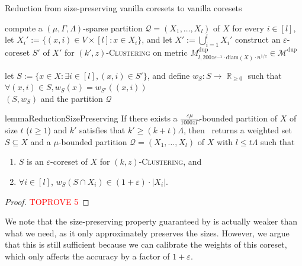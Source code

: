 \documentclass[letterpaper,11pt]{article}
\theoremstyle{plain}
\theoremstyle{definition}
\theoremstyle{remark}
\DeclareMathOperator{\R}{\mathbb{R}}
\newcommand{\diam}{\mathrm{diam}}
\newcommand{\dup}{\mathrm{dup}}
\newcommand{\eps}{\varepsilon}
\newcommand{\calM}{\mathcal{M}}
\newcommand{\calQ}{\mathcal{Q}}
\newcommand{\ProblemName}[1]{\textsc{#1}}
\newcommand{\kzC}{\ProblemName{$(k,z)$-Clustering}\xspace}
\newcommand{\tzC}[1]{\ProblemName{$(#1,z)$-Clustering}\xspace}
\begin{document}
\begin{algorithm}[ht]
    \caption{Reduction from size-preserving vanilla coresets to vanilla coresets}
    \label{alg:size-preserving}
    \begin{algorithmic}[1]
        \State compute a $(\mu,\Gamma,\Lambda)$-sparse partition $\calQ=(X_1,\dots,X_l)$ of $X$ \label{alg line:sparse partition} 
        \State for every $i\in [l]$, let $X_i':=\{(x,i)\in V\times [l]: x\in X_i\}$, and let $X':=\bigcup_{i=1}^l X_i'$
        \label{alg line:mapping}
        \State construct an $\eps$-coreset $S'$ of $X'$ for \tzC{k'} on metric $M^\dup_{l,200z\eps^{-1}\cdot \diam(X)\cdot n^{1/z}}\in \calM^\dup$ \label{alg line:vanilla coreset}


        \State let $S:=\{x\in X: \exists i\in[l], (x,i)\in S'\}$, and define $w_S:S\to\R_{\ge 0}$ such that 
        $
            \forall (x,i)\in S, w_S(x) = w_{S'}((x,i))
        $
        \label{alg line:preimage}
        \\
        \Return $(S,w_S)$ and the partition $\calQ$
    \end{algorithmic}
\end{algorithm}
\begin{restatable}{lemma}{ReductionSizePreserving}
    \label{lem:size-preserving}
    If there exists a $\frac{\eps\mu}{1000z\Gamma}$-bounded partition of $X$ of size $t$ ($t\ge 1$) and $k'$ satisfies that $k' \ge (k+t)\Lambda$, then~ returns a weighted set $S\subseteq X$ and a $\mu$-bounded partition $\calQ = (X_1,\dots,X_l)$ of $X$ with $l\le t\Lambda$ such that
    \begin{enumerate}
        \item $S$ is an $\eps$-coreset of $X$ for \kzC, and
        \item $\forall i\in [l]$, $w_S(S\cap X_i)\in (1+\eps)\cdot |X_i|$.
    \end{enumerate}
\end{restatable}
\begin{proof}\textcolor{red}{TOPROVE 5}\end{proof}


We note that the size-preserving property guaranteed by  is actually weaker than what we need, as it only approximately preserves the sizes. However, we argue that this is still sufficient because we can calibrate the weights of this coreset, which only affects the accuracy by a factor of $1+\eps$.
\end{document}
